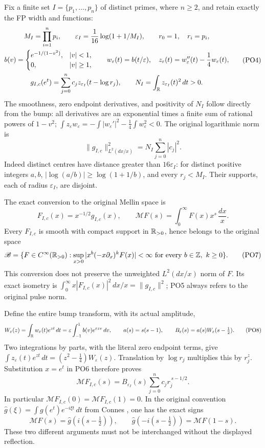 Fix a finite set \(I=\{p_1,\ldots,p_n\}\) of distinct primes,
where \(n\ge2\), and retain exactly the FP width and functions:
\[
 \begin{gathered}
 M_I=\prod_{i=1}^np_i,\qquad
 \varepsilon_I=\frac1{16}\log(1+1/M_I),\qquad r_0=1,\quad r_i=p_i,\\
 b(v)=
 \begin{cases}e^{-1/(1-v^2)},&|v|<1,\\0,&|v|\ge1,\end{cases}
 \qquad
 w_\varepsilon(t)=b(t/\varepsilon),\quad
 z_\varepsilon(t)=w_\varepsilon''(t)-\frac14w_\varepsilon(t),\\
 g_{I,c}(e^t)=\sum_{j=0}^n c_jz_{\varepsilon_I}(t-\log r_j),
 \qquad
 N_I=\int_\mathbb R z_{\varepsilon_I}(t)^2\,dt>0 .
 \end{gathered}
 \tag{PO4}\label{PO:po:pulse}
\]
The smoothness, zero endpoint derivatives, and positivity of \(N_I\)
follow directly from the bump: all derivatives are an exponential
times a finite sum of rational powers of \(1-v^2\);
\(\int z_\varepsilon w_\varepsilon=-\int|w_\varepsilon'|^2-\tfrac14\int w_\varepsilon^2<0\).
The original logarithmic norm is
\[
 \|g_{I,c}\|_{L^2(dx/x)}^2=N_I\sum_{j=0}^n|c_j|^2 .
 \tag{PO5}\label{PO:po:norm}
\]
Indeed distinct centres have distance greater than \(16\varepsilon_I\):
for distinct positive integers \(a,b\),
\(|\log(a/b)|\ge\log(1+1/b)\), and every \(r_j<M_I\).
Their supports, each of radius \(\varepsilon_I\), are disjoint.

The exact conversion to the original Mellin space is
\[
 F_{I,c}(x)=x^{-1/2}g_{I,c}(x),\qquad
 \mathcal M F(s)=\int_0^\infty F(x)x^s\,\frac{dx}{x}.
 \tag{PO6}\label{PO:po:conversion}
\]
Every \(F_{I,c}\) is smooth with compact support in
\(\mathbb R_{>0}\), hence belongs to the original space
\[
 \mathscr B=\{F\in C^\infty(\mathbb R_{>0}):
       \sup_{x>0}|x^b(-x\partial_x)^kF(x)|<\infty
                \text{ for every }b\in\mathbb Z,\ k\ge0\}.
 \tag{PO7}
\]
This conversion does not preserve the unweighted \(L^2(dx/x)\)
norm of \(F\). Its exact isometry is
\(\int_0^\infty x|F_{I,c}(x)|^2\,dx/x=\|g_{I,c}\|^2\);
PO5 always refers to the original pulse norm.

Define the entire bump transform, with its actual amplitude,
\[
 W_\varepsilon(z)=\int_\mathbb R w_\varepsilon(t)e^{zt}\,dt
     =\varepsilon\int_{-1}^1 b(v)e^{\varepsilon zv}\,dv,\qquad
 a(s)=s(s-1),\qquad B_\varepsilon(s)=a(s)W_\varepsilon(s-\tfrac12).
 \tag{PO8}\label{PO:po:bump}
\]
Two integrations by parts, with the literal zero endpoint terms,
give \(\int z_\varepsilon(t)e^{zt}\,dt=(z^2-\tfrac14)W_\varepsilon(z)\).
Translation by \(\log r_j\) multiplies this by \(r_j^z\).
Substitution \(x=e^t\) in PO6 therefore proves
\[
 \boxed{\quad
 \mathcal M F_{I,c}(s)=B_{\varepsilon_I}(s)
             \sum_{j=0}^n c_j r_j^{\,s-1/2}.
 \quad}
 \tag{PO9}\label{PO:po:transform}
\]
In particular \(\mathcal M F_{I,c}(0)=\mathcal M F_{I,c}(1)=0\).
In the original convention
\(\widehat g(\xi)=\int g(e^t)e^{-i\xi t}\,dt\) from
Connes \cite{PO:Connes}, one has the exact signs
\[
 \mathcal M F(s)=\widehat g(i(s-\tfrac12)),\qquad
 \widehat g(-i(s-\tfrac12))=\mathcal M F(1-s).
 \tag{PO10}\label{PO:po:Fourier}
\]
These two different arguments must not be interchanged without
the displayed reflection.

